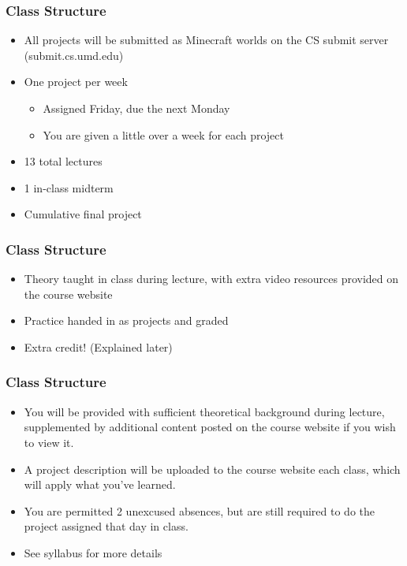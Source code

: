 \documentclass{beamer}
\begin{document}
            \begin{frame}
                \frametitle{Class Structure}
                    \begin{itemize}
                        \item All projects will be submitted as Minecraft worlds on the CS submit server (submit.cs.umd.edu)
                        \item One project per week
                            \begin{itemize}
                                \item Assigned Friday, due the next Monday
                                \item You are given a little over a week for each project
                            \end{itemize}
                        \item 13 total lectures
                        \item 1 in-class midterm
                        \item Cumulative final project
                    \end{itemize}
            \end{frame}
            
            \begin{frame}
                \frametitle{Class Structure}
                    \begin{itemize}
                        \item Theory taught in class during lecture, with extra video resources provided on the course website
                        \item Practice handed in as projects and graded
                        \item Extra credit! (Explained later)
                    \end{itemize}
            \end{frame}
            
            \begin{frame}
                \frametitle{Class Structure}
                    \begin{itemize}
                        \item You will be provided with sufficient theoretical background during lecture, supplemented by additional content posted on the course website if you wish to view it.
                        \item A project description will be uploaded to the course website each class, which will apply what you've learned.
                        \item You are permitted 2 unexcused absences, but are still required to do the project assigned that day in class.
                        \item See syllabus for more details
                    \end{itemize}
            \end{frame}
            
\end{document}
